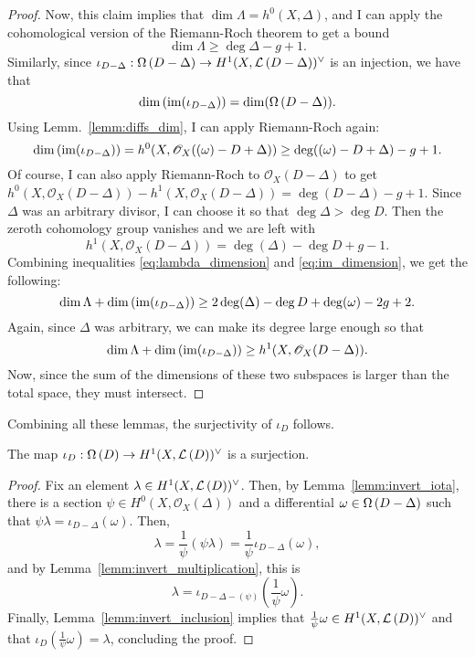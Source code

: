 \begin{proof}
  Now, this claim implies that $\dim\Lambda=h^{0}(X,\Delta)$, and I can apply
  the cohomological version of the Riemann-Roch theorem to get a bound
  \begin{equation}\label{eq:lambda_dimension}
    \dim\Lambda\geq \deg{\Delta}-g+1.
  \end{equation}
  Similarly, since $\iota_{D-\Delta}:\Omega\left(D-\Delta\right)\to H^1(X,\mathcal{L}\left(D-\Delta\right))^{\vee}$
  is an injection, we have that
  \[
    \dim\left(\operatorname{im}(\iota_{D-\Delta})\right) =\dim(\Omega\left(D-\Delta\right)).
  \]
  Using Lemm.~\ref{lemm:diffs_dim}, I can apply Riemann-Roch again:
  \begin{equation}\label{eq:im_dimension}
    \dim\left(\operatorname{im}(\iota_{D-\Delta})\right)
    =h^{0}(X,\mathscr{O}_X((\omega)-D+\Delta))\geq \deg((\omega)-D+\Delta)-g+1.
  \end{equation}
  Of course, I can also apply Riemann-Roch to $\mathscr{O}_X(D-\Delta)$
  to get $h^{0}(X,\mathscr{O}_X(D-\Delta))-h^{1}(X,\mathscr{O}_X(D-\Delta))
  =\deg(D-\Delta)-g+1$. Since $\Delta$ was an arbitrary divisor, I can
  choose it so that $\deg\Delta >\deg D$. Then the zeroth cohomology
  group vanishes and we are left with
  \begin{equation}\label{eq:fst_dimension}
    h^{1}(X,\mathscr{O}_X(D-\Delta))=\deg(\Delta)-\deg D+g-1.
  \end{equation}
  Combining inequalities \eqref{eq:lambda_dimension} and
  \eqref{eq:im_dimension}, we get the following:
  \[
    \dim\Lambda+\dim\left(\operatorname{im}(\iota_{D-\Delta})\right)
    \geq 2\deg(\Delta)-\deg D+\deg(\omega)-2g+2.
  \]
  Again, since $\Delta$ was arbitrary, we can make its degree large enough
  so that
  \[
    \dim\Lambda+\dim\left(\operatorname{im}(\iota_{D-\Delta})\right)
    \geq h^{1}(X,\mathscr{O}_X(D-\Delta)).
  \]
  Now, since the sum of the dimensions of these two subspaces is larger
  than the total space, they must intersect.
\end{proof}
Combining all these lemmas, the surjectivity of $\iota_{D}$ follows.
\begin{prop}\label{prop:surjectivity}
  The map $\iota_{D}:\Omega\left(D\right)\to H^1(X,\mathcal{L}\left(D\right))^{\vee}$ is a surjection.
\end{prop}
\begin{proof}
  Fix an element $\lambda\in H^1(X,\mathcal{L}\left(D\right))^{\vee}$. Then, by Lemma~\ref{lemm:invert_iota},
  there is a section $\psi\in H^{0}(X,\mathscr{O}_X(\Delta))$ and a differential
  $\omega\in\Omega\left(D-\Delta\right)$ such that $\psi\lambda=\iota_{D-\Delta}(\omega)$.
  Then,
  \[\lambda=\frac1{\psi}(\psi\lambda)=\frac1{\psi}\iota_{D-\Delta}(\omega),\]
  and by Lemma~\ref{lemm:invert_multiplication}, this is
  \[\lambda=\iota_{D-\Delta-(\psi)}(\frac1{\psi}\omega).\]
  Finally, Lemma~\ref{lemm:invert_inclusion} implies that
  $\frac1{\psi}\omega\in H^1(X,\mathcal{L}\left(D\right))^{\vee}$ and that $\iota_{D}(\frac1{\psi}\omega)
  =\lambda$, concluding the proof.
\end{proof}
